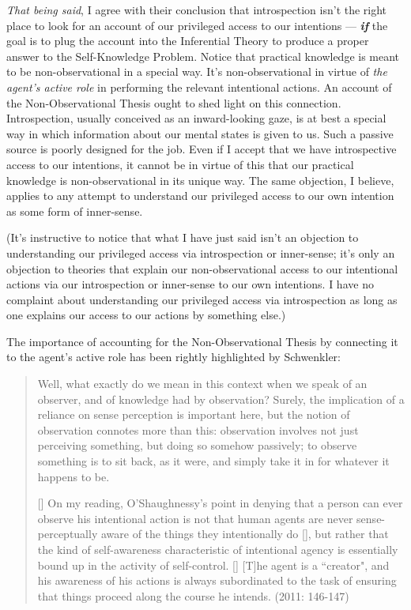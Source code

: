 \documentclass[a4paper,12pt]{article}
\begin{document}
\emph{That being said}, I agree with their conclusion that introspection isn't the right place to look for an account of our privileged access to our intentions --- \emph{\textbf{if}} the goal is to plug the account into the Inferential Theory to produce a proper answer to the Self-Knowledge Problem. Notice that practical knowledge is meant to be non-observational in a special way. It's non-observational in virtue of \emph{the agent's active role} in performing the relevant intentional actions. An account of the Non-Observational Thesis ought to shed light on this connection. Introspection, usually conceived as an inward-looking gaze, is at best a special way in which information about our mental states is given to us. Such a passive source is poorly designed for the job. Even if I accept that we have introspective access to our intentions, it cannot be in virtue of this that our practical knowledge is non-observational in its unique way. The same objection, I believe, applies to any attempt to understand our privileged access to our own intention as some form of inner-sense.

(It's instructive to notice that what I have just said isn't an objection to understanding our privileged access via introspection or inner-sense; it's only an objection to theories that explain our non-observational access to our intentional actions via our introspection or inner-sense to our own intentions. I have no complaint about understanding our privileged access via introspection as long as one explains our access to our actions by something else.)

The importance of accounting for the Non-Observational Thesis by connecting it to the agent's active role has been rightly highlighted by Schwenkler:

\begin{quote} Well, what exactly do we mean in this context when we speak of an observer, and of knowledge had by observation? Surely, the implication of a reliance on sense perception is important here, but the notion of observation connotes more than this: observation involves not just perceiving something, but doing so somehow passively; to observe something is to sit back, as it were, and simply take it in for whatever it happens to be.

[\textellipsis] On my reading, O'Shaughnessy's point in denying that a person can ever observe his intentional action is not that human agents are never sense-perceptually aware of the things they intentionally do [\textellipsis], but rather that the kind of self-awareness characteristic of intentional agency is essentially bound up in the activity of self-control. [\textellipsis] [T]he agent is a ``creator", and his awareness of his actions is always subordinated to the task of ensuring that things proceed along the course he intends. (2011: 146-147) \end{quote}
\end{document}
